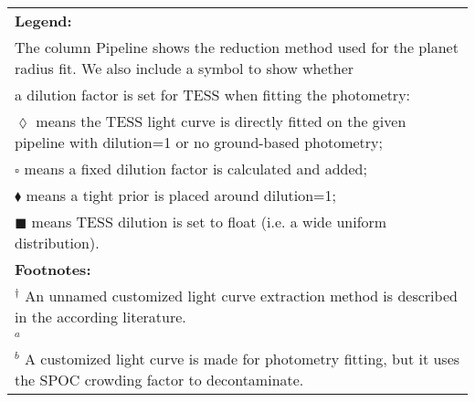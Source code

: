 \begin{longtable}{llrllr}
\hline
\multicolumn{6}{l}{\textbf{Legend:}} \\
\multicolumn{6}{l}{The column Pipeline shows the reduction method used for the planet radius fit. We also include a symbol to show whether } \\
\multicolumn{6}{l}{a dilution factor is set for TESS when fitting the photometry:} \\
\multicolumn{6}{l}{$\lozenge$ means the TESS light curve is directly fitted on the given pipeline with dilution=1 or no ground-based photometry;} \\
\multicolumn{6}{l}{$\square$ means a fixed dilution factor is calculated and added;} \\
\multicolumn{6}{l}{$\blacklozenge$ means a tight prior is placed around dilution=1;} \\
\multicolumn{6}{l}{$\blacksquare$ means TESS dilution is set to float (i.e. a wide uniform distribution).} \\
\multicolumn{6}{l}{\textbf{Footnotes:}} \\
\multicolumn{6}{l}{$^\dagger$ An unnamed customized light curve extraction method is described in the according literature. } \\
\multicolumn{6}{l}{$^a$ \cite{TASOC}} \\
\multicolumn{6}{l}{$^b$ A customized light curve is made for photometry fitting, but it uses the SPOC crowding factor to decontaminate.} \\
\end{longtable}